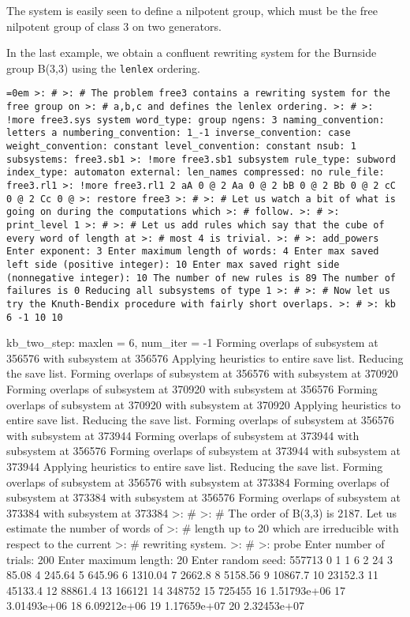 \bigskip

\noindent The system is easily seen to define a nilpotent group, which
must be the free nilpotent group of class 3 on two generators.

In the last example, we obtain a confluent rewriting system for the
Burnside group B(3,3) using the {\tt lenlex} ordering.

\bigskip

{\tt \obeylines\obeyspaces \parindent=0em \parskip=0in \ttspace
>: \#
>: \# The problem free3 contains a rewriting system for the free group on
>: \# {a,b,c} and defines the lenlex ordering.
>: \#
>: !more free3.sys
system
word\_type:  group
ngens:  3
naming\_convention:  letters a
numbering\_convention:  1\_-1
inverse\_convention:  case
weight\_convention:  constant
level\_convention:  constant
nsub:  1
subsystems:  
free3.sb1
>: !more free3.sb1
subsystem
rule\_type:  subword
index\_type:  automaton
external:  len\_names
compressed:  no
rule\_file:  free3.rl1
>: !more free3.rl1
2 aA 0 @
2 Aa 0 @
2 bB 0 @
2 Bb 0 @
2 cC 0 @
2 Cc 0 @
>: restore free3
>: \#
>: \# Let us watch a bit of what is going on during the computations which
>: \# follow.
>: \#
>: print\_level 1
>: \#
>: \# Let us add rules which say that the cube of every word of length at
>: \# most 4 is trivial.
>: \#
>: add\_powers
Enter exponent:  3
Enter maximum length of words:  4
Enter max saved left side (positive integer):  10
Enter max saved right side (nonnegative integer):  10
The number of new rules is 89
The number of failures is 0
Reducing all subsystems of type 1
>: \#
>: \# Now let us try the Knuth-Bendix procedure with fairly short overlaps.
>: \#
>: kb 6 -1 10 10

kb\_two\_step:  maxlen = 6, num\_iter = -1
Forming overlaps of subsystem at 356576 with subsystem at 356576
Applying heuristics to entire save list.
Reducing the save list.
Forming overlaps of subsystem at 356576 with subsystem at 370920
Forming overlaps of subsystem at 370920 with subsystem at 356576
Forming overlaps of subsystem at 370920 with subsystem at 370920
Applying heuristics to entire save list.
Reducing the save list.
Forming overlaps of subsystem at 356576 with subsystem at 373944
Forming overlaps of subsystem at 373944 with subsystem at 356576
Forming overlaps of subsystem at 373944 with subsystem at 373944
Applying heuristics to entire save list.
Reducing the save list.
Forming overlaps of subsystem at 356576 with subsystem at 373384
Forming overlaps of subsystem at 373384 with subsystem at 356576
Forming overlaps of subsystem at 373384 with subsystem at 373384
>: \#
>: \# The order of B(3,3) is 2187.  Let us estimate the number of words of
>: \# length up to 20 which are irreducible with respect to the current
>: \# rewriting system.
>: \#
>: probe
Enter number of trials:  200
Enter maximum length:  20
Enter random seed:  557713
   0             1      1             6      2            24
   3         85.08      4        245.64      5        645.96
   6       1310.04      7        2662.8      8       5158.56
   9       10867.7     10       23152.3     11       45133.4
  12       88861.4     13        166121     14        348752
  15        725455     16   1.51793e+06     17   3.01493e+06
  18   6.09212e+06     19   1.17659e+07     20   2.32453e+07


}
